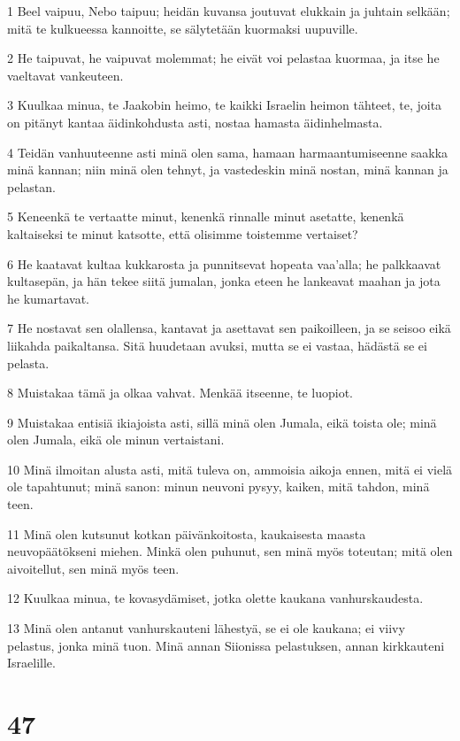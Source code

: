 \par 1 Beel vaipuu, Nebo taipuu; heidän kuvansa joutuvat elukkain ja juhtain selkään; mitä te kulkueessa kannoitte, se sälytetään kuormaksi uupuville.
\par 2 He taipuvat, he vaipuvat molemmat; he eivät voi pelastaa kuormaa, ja itse he vaeltavat vankeuteen.
\par 3 Kuulkaa minua, te Jaakobin heimo, te kaikki Israelin heimon tähteet, te, joita on pitänyt kantaa äidinkohdusta asti, nostaa hamasta äidinhelmasta.
\par 4 Teidän vanhuuteenne asti minä olen sama, hamaan harmaantumiseenne saakka minä kannan; niin minä olen tehnyt, ja vastedeskin minä nostan, minä kannan ja pelastan.
\par 5 Keneenkä te vertaatte minut, kenenkä rinnalle minut asetatte, kenenkä kaltaiseksi te minut katsotte, että olisimme toistemme vertaiset?
\par 6 He kaatavat kultaa kukkarosta ja punnitsevat hopeata vaa'alla; he palkkaavat kultasepän, ja hän tekee siitä jumalan, jonka eteen he lankeavat maahan ja jota he kumartavat.
\par 7 He nostavat sen olallensa, kantavat ja asettavat sen paikoilleen, ja se seisoo eikä liikahda paikaltansa. Sitä huudetaan avuksi, mutta se ei vastaa, hädästä se ei pelasta.
\par 8 Muistakaa tämä ja olkaa vahvat. Menkää itseenne, te luopiot.
\par 9 Muistakaa entisiä ikiajoista asti, sillä minä olen Jumala, eikä toista ole; minä olen Jumala, eikä ole minun vertaistani.
\par 10 Minä ilmoitan alusta asti, mitä tuleva on, ammoisia aikoja ennen, mitä ei vielä ole tapahtunut; minä sanon: minun neuvoni pysyy, kaiken, mitä tahdon, minä teen.
\par 11 Minä olen kutsunut kotkan päivänkoitosta, kaukaisesta maasta neuvopäätökseni miehen. Minkä olen puhunut, sen minä myös toteutan; mitä olen aivoitellut, sen minä myös teen.
\par 12 Kuulkaa minua, te kovasydämiset, jotka olette kaukana vanhurskaudesta.
\par 13 Minä olen antanut vanhurskauteni lähestyä, se ei ole kaukana; ei viivy pelastus, jonka minä tuon. Minä annan Siionissa pelastuksen, annan kirkkauteni Israelille.

\chapter{47}

